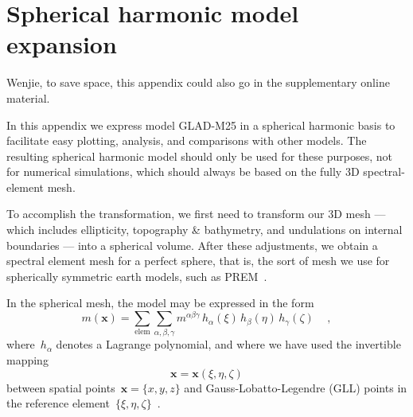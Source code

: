\documentclass[extra,mreferee]{gji}
\begin{document}
\newpage

\appendix

\section{Spherical harmonic model expansion}

{\color{red} Wenjie, to save space, this appendix could also go in the supplementary online material.} 

In this appendix we express model GLAD-M25 in a spherical harmonic basis
to facilitate easy plotting, analysis, and comparisons with other models.
The resulting spherical harmonic model should only be used for these purposes, not for numerical simulations, which should always be based on the fully 3D spectral-element mesh.

To accomplish the transformation,
we first need to transform our 3D mesh --- which includes ellipticity, topography \& bathymetry, and undulations on internal boundaries --- into a spherical volume.
After these adjustments, we obtain a spectral element mesh for a perfect sphere,
that is, the sort of mesh we use for spherically symmetric earth models, such as PREM~\citep{PREM}.

In the spherical mesh, the model may be expressed in the form
\begin{equation}
    m(\mathbf{x})=\sum_{\mathrm{elem}}\sum_{\alpha,\beta,\gamma}m^{\alpha\beta\gamma}\,h_{\alpha}(\xi)\,h_{\beta}(\eta)\,h_{\gamma}(\zeta)\,
    \quad ,
\end{equation}
where~$h_\alpha$ denotes a Lagrange polynomial, and where we have used the invertible mapping
\begin{equation}
    \mathbf{x}=\mathbf{x}(\xi,\eta,\zeta)
    \label{eq:map}
\end{equation}
between spatial points~$\mathbf{x}=\{x,y,z\}$ and Gauss-Lobatto-Legendre (GLL) points in the reference element~$\{\xi,\eta,\zeta\}$~\citep{KoTr99}.
\end{document}

